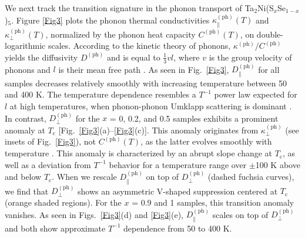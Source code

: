 \documentclass[aps,prl,twocolumn,superscriptaddress]{revtex4-2}
\begin{document}
We next track the transition signature in the phonon transport of Ta$_2$Ni(S$_x$Se$_{1-x}$)$_5$. Figure \ref{Fig3} plots the phonon thermal conductivities $\kappa^{(\textrm{ph})}_{\parallel}(T)$ and $\kappa^{(\textrm{ph})}_{\perp}(T)$, normalized by the phonon heat capacity $C^{(\textrm{ph})}(T)$, on double-logarithmic scales. According to the kinetic theory of phonons, $\kappa^{(\textrm{ph})}/C^{(\textrm{ph})}$ yields the diffusivity $D^{(\textrm{ph})}$ and is equal to $\frac{1}{3}v l$, where $v$ is the group velocity of phonons and $l$ is their mean free path \cite{Berman_1976}. As seen in Fig.~\ref{Fig3}, $D^{(\textrm{ph})}_{\parallel}$ for all samples decreases relatively smoothly with increasing temperature between 50 and 400 K. The temperature dependence resembles a $T^{-1}$ power law expected for $l$ at high temperatures, when phonon-phonon Umklapp scattering is dominant \cite{Berman_1976}. In contrast, $D^{(\textrm{ph})}_{\perp}$ for the $x$ = 0, 0.2, and 0.5 samples exhibits a prominent anomaly at $T_\textrm{c}$ [Fig.~\ref{Fig3}(a)--\ref{Fig3}(c)]. This anomaly originates from $\kappa^{(\textrm{ph})}_{\perp}$ (see insets of Fig.~\ref{Fig3}), not $C^{(\textrm{ph})}(T)$, as the latter evolves smoothly with temperature \cite{SM}. This anomaly is characterized by an abrupt slope change at $T_\textrm{c}$, as well as a deviation from $T^{-1}$ behavior for a temperature range over $\pm$100 K above and below $T_\textrm{c}$. When we rescale $D^{(\textrm{ph})}_{\parallel}$ on top of $D^{(\textrm{ph})}_{\perp}$ (dashed fuchsia curves), we find that $D^{(\textrm{ph})}_{\perp}$ shows an asymmetric V-shaped suppression centered at $T_\textrm{c}$ (orange shaded regions). For the $x$ = 0.9 and 1 samples, this transition anomaly vanishes. As seen in Figs.~\ref{Fig3}(d) and \ref{Fig3}(e), $D^{(\textrm{ph})}_{\parallel}$ scales on top of $D^{(\textrm{ph})}_{\perp}$ and both show approximate $T^{-1}$ dependence from 50 to 400 K.
\end{document}
